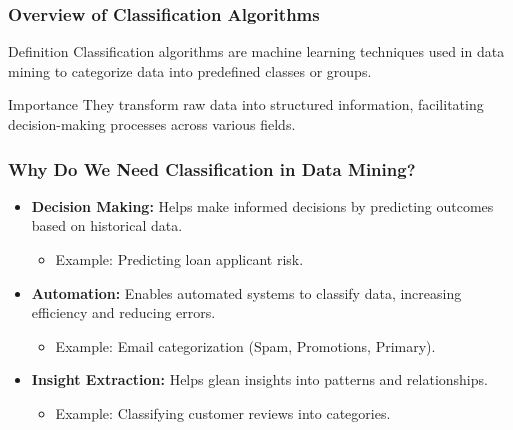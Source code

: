 \documentclass[aspectratio=169]{beamer}
\begin{document}
\frame{\titlepage}

\begin{frame}[fragile]
    \titlepage
\end{frame}

\begin{frame}[fragile]
    \frametitle{Overview of Classification Algorithms}
    \begin{block}{Definition}
        Classification algorithms are machine learning techniques used in data mining to categorize data into predefined classes or groups.
    \end{block}
    
    \begin{block}{Importance}
        They transform raw data into structured information, facilitating decision-making processes across various fields.
    \end{block}
\end{frame}

\begin{frame}[fragile]
    \frametitle{Why Do We Need Classification in Data Mining?}
    \begin{itemize}
        \item \textbf{Decision Making:} Helps make informed decisions by predicting outcomes based on historical data.
        \begin{itemize}
            \item Example: Predicting loan applicant risk.
        \end{itemize}
        
        \item \textbf{Automation:} Enables automated systems to classify data, increasing efficiency and reducing errors.
        \begin{itemize}
            \item Example: Email categorization (Spam, Promotions, Primary).
        \end{itemize}
        
        \item \textbf{Insight Extraction:} Helps glean insights into patterns and relationships.
        \begin{itemize}
            \item Example: Classifying customer reviews into categories.
        \end{itemize}
    \end{itemize}
\end{frame}
\end{document}
